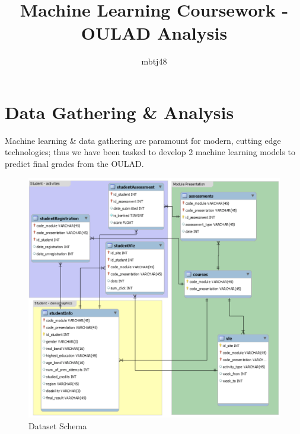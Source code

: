\documentclass[11pt, a4paper, twocolumn]{article}
\title{\vspace{-1.25cm}Machine Learning Coursework - OULAD Analysis}
\author{mbtj48}
\date{}
\begin{document}
\maketitle

\section{Data Gathering \& Analysis}

Machine learning \& data gathering are paramount for modern, cutting edge technologies; thus we have been tasked to develop 2 machine learning models to predict final grades from the OULAD.

\begin{figure}[H]
	\includegraphics[width=\linewidth]{dataset.png} 
	\caption{Dataset Schema}
	\label{fig:schema}
\end{figure}
\end{document}
